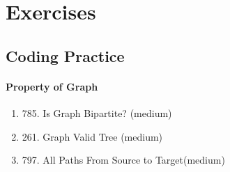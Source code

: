 \documentclass[../main.tex]{subfiles}
\begin{document}


\section{Exercises}
\subsection{Coding Practice}
\paragraph{Property of Graph}
\begin{enumerate}
    \item 785. Is Graph Bipartite? (medium)
    \item 261. Graph Valid Tree (medium) 
    \item 797. All Paths From Source to Target(medium)
\end{enumerate}
\end{document}
